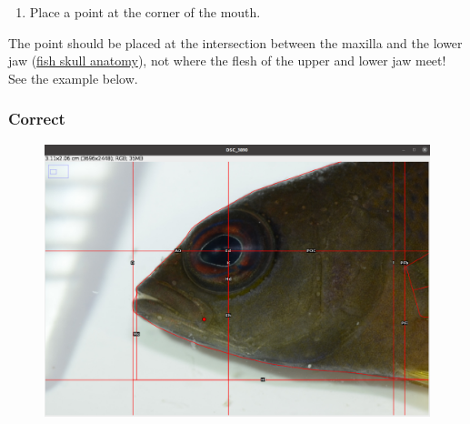 \documentclass[
  letterpaper,
]{scrbook}
\providecommand{\tightlist}{%
  \setlength{\itemsep}{0pt}\setlength{\parskip}{0pt}}\usepackage{longtable,booktabs,array}
\begin{document}
\begin{enumerate}
\def\labelenumi{\arabic{enumi}.}
\setcounter{enumi}{12}
\tightlist
\item
  Place a point at the corner of the mouth.
\end{enumerate}

\begin{tcolorbox}[standard jigsaw,bottomtitle=1mm, toptitle=1mm, colframe=quarto-callout-important-color-frame, colbacktitle=quarto-callout-important-color!10!white, title=\textcolor{quarto-callout-important-color}{\faExclamation}\hspace{0.5em}{Important}, titlerule=0mm, opacityback=0, arc=.35mm, opacitybacktitle=0.6, rightrule=.15mm, toprule=.15mm, coltitle=black, left=2mm, colback=white, leftrule=.75mm, bottomrule=.15mm]
The point should be placed at the intersection between the maxilla and
the lower jaw
(\href{https://en.wikipedia.org/wiki/Fish_jaw\#/media/File:FishKeyDay.jpg}{fish
skull anatomy}), not where the flesh of the upper and lower jaw meet!
See the example below.
\end{tcolorbox}

\hypertarget{correct}{%
\subsubsection{\texorpdfstring{\textbf{Correct}}{Correct}}\label{correct}}

\begin{figure}

{\centering \includegraphics{./images/screenshots/mouth_corner_correct.png}

}

\end{figure}
\end{document}
